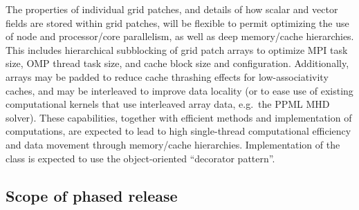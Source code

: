 \documentclass[11pt]{article}
\begin{document}

    The properties of individual grid patches, and details of how
    scalar and vector fields are stored within grid patches, will be
    flexible to permit optimizing the use of node and processor/core
    parallelism, as well as deep memory/cache hierarchies.  This
    includes hierarchical subblocking of grid patch arrays to optimize
    MPI task size, OMP thread task size, and cache block size and
    configuration.  Additionally, arrays may be padded to reduce cache
    thrashing effects for low-associativity caches, and may be
    interleaved to improve data locality (or to ease use of existing
    computational kernels that use interleaved array data, e.g.~the
    PPML MHD solver).  These capabilities, together with efficient
    methods and implementation of computations, are expected to lead
    to high single-thread computational efficiency and data movement
    through memory/cache hierarchies.  Implementation of the
     class is expected to use the object-oriented
    ``decorator pattern''.






\subsection{Scope of phased release}


\end{document}
